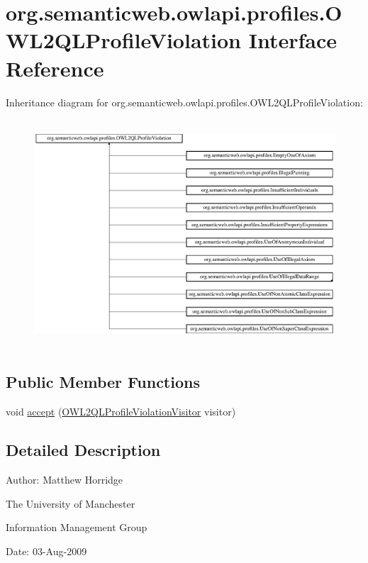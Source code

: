 \hypertarget{interfaceorg_1_1semanticweb_1_1owlapi_1_1profiles_1_1_o_w_l2_q_l_profile_violation}{\section{org.\-semanticweb.\-owlapi.\-profiles.\-O\-W\-L2\-Q\-L\-Profile\-Violation Interface Reference}
\label{interfaceorg_1_1semanticweb_1_1owlapi_1_1profiles_1_1_o_w_l2_q_l_profile_violation}
}
Inheritance diagram for org.\-semanticweb.\-owlapi.\-profiles.\-O\-W\-L2\-Q\-L\-Profile\-Violation\-:\begin{figure}[H]
\begin{center}
\leavevmode
\includegraphics[height=8.527918cm]{interfaceorg_1_1semanticweb_1_1owlapi_1_1profiles_1_1_o_w_l2_q_l_profile_violation}
\end{center}
\end{figure}
\subsection*{Public Member Functions}
\begin{DoxyCompactItemize}
\item 
void \hyperlink{interfaceorg_1_1semanticweb_1_1owlapi_1_1profiles_1_1_o_w_l2_q_l_profile_violation_aa4af59cf2c8de3f65b5f1fd1333e29a2}{accept} (\hyperlink{interfaceorg_1_1semanticweb_1_1owlapi_1_1profiles_1_1_o_w_l2_q_l_profile_violation_visitor}{O\-W\-L2\-Q\-L\-Profile\-Violation\-Visitor} visitor)
\end{DoxyCompactItemize}


\subsection{Detailed Description}
Author\-: Matthew Horridge\par
 The University of Manchester\par
 Information Management Group\par
 Date\-: 03-\/\-Aug-\/2009 

